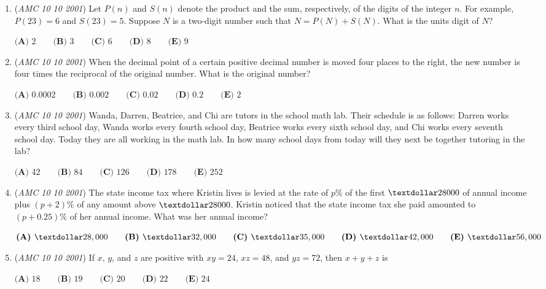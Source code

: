 \begin{enumerate}
	\item (\textit{AMC 10 10 2001}) Let $P(n)$ and $S(n)$ denote the product and the sum, respectively, of the digits
of the integer $n$. For example, $P(23) = 6$ and $S(23) = 5$. Suppose $N$ is a
two-digit number such that $N = P(N)+S(N)$. What is the units digit of $N$?


 $\textbf{(A) } 2 \qquad\textbf{(B) } 3 \qquad\textbf{(C) } 6 \qquad\textbf{(D) } 8 \qquad\textbf{(E) } 9$


	\item (\textit{AMC 10 10 2001}) When the decimal point of a certain positive decimal number is moved four
places to the right, the new number is four times the reciprocal of the original
number. What is the original number?


 $\textbf{(A) } 0.0002 \qquad\textbf{(B) } 0.002 \qquad\textbf{(C) } 0.02 \qquad\textbf{(D) } 0.2 \qquad\textbf{(E) } 2$


	\item (\textit{AMC 10 10 2001}) Wanda, Darren, Beatrice, and Chi are tutors in the school math lab. Their
schedule is as follows: Darren works every third school day, Wanda works
every fourth school day, Beatrice works every sixth school day, and Chi works
every seventh school day. Today they are all working in the math lab. In how
many school days from today will they next be together tutoring in the lab?


 $\textbf{(A) } 42 \qquad\textbf{(B) } 84 \qquad\textbf{(C) } 126 \qquad\textbf{(D) } 178 \qquad\textbf{(E) } 252$


	\item (\textit{AMC 10 10 2001}) The state income tax where Kristin lives is levied at the rate of $p\%$ of the first $\textdollar 28000$ of annual income plus $(p + 2)\%$ of any amount above $\textdollar 28000$. Kristin noticed that the state income tax she paid amounted to $(p + 0.25)\%$ of her annual income. What was her annual income?


 $\textbf{(A) } \textdollar 28,000\qquad\textbf{(B) } \textdollar 32,000\qquad\textbf{(C) }\textdollar 35,000\qquad\textbf{(D) } \textdollar 42,000\qquad\textbf{(E) } \textdollar 56,000$


	\item (\textit{AMC 10 10 2001}) If $x$, $y$, and $z$ are positive with $xy = 24$, $xz = 48$, and $yz = 72$, then $x + y + z$ is


 $\textbf{(A) }18\qquad\textbf{(B) }19\qquad\textbf{(C) }20\qquad\textbf{(D) }22\qquad\textbf{(E) }24$



\end{enumerate}
